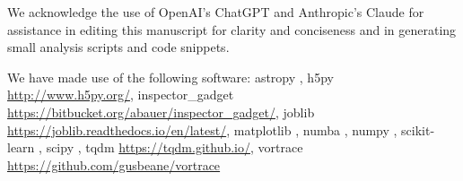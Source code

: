 We acknowledge the use of OpenAI’s ChatGPT and Anthropic's Claude for assistance in editing this manuscript for clarity and conciseness and in generating small analysis scripts and code snippets.

We have made use of the following software: {\sc astropy} \citep{astropy:2013,astropy:2018,astropy:2022}, {\sc h5py} \url{http://www.h5py.org/}, {\sc inspector\_gadget} \url{https://bitbucket.org/abauer/inspector_gadget/}, {\sc joblib} \url{https://joblib.readthedocs.io/en/latest/}, {\sc matplotlib} \citep{Hunter:2007}, {\sc numba} \citep{lam2015numba}, {\sc numpy} \citep{harris2020array}, {\sc scikit-learn} \citep{scikit-learn}, {\sc scipy} \citep{2020SciPy-NMeth}, {\sc tqdm} \url{https://tqdm.github.io/}, {\sc vortrace} \url{https://github.com/gusbeane/vortrace}
